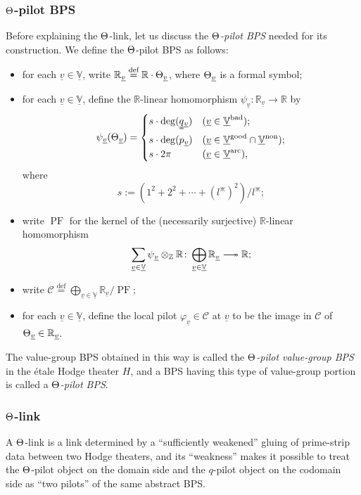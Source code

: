 \documentclass[12pt, reqno, a4paper]{amsart}
\def\udl#1{\underline{#1}} %
\def\eqdef{\stackrel{\textrm{def}}{=}} %
\def\surjlongto{\relbar\joinrel\twoheadrightarrow}
\def\bZ{\mathbb{Z}} %
\def\bR{\mathbb{R}} %
\def\bV{\mathbb{V}}
\def\cC{{\mathcal{C}}}
\def\uV{\udl{\bV}} %
\def\uv{\udl{v}} %
\def\bad{\mathrm{bad}}
\def\good{\mathrm{good}}
\DeclareMathOperator{\PF}{PF}
\def\non{\mathrm{non}}
\def\arc{\mathrm{arc}}
\begin{document}
\subsubsection{$\Th$-pilot BPS}\label{subsub:ThPilotBPS}
Before explaining the \(\Th\)-link, let us discuss the \emph{$\Th$-pilot BPS} needed for its construction.
We define the $\Th$-pilot BPS as follows: 
\begin{itemize}
\item
for each $\uv \in \uV$, write $\bR_{\uv} \eqdef \bR \cdot \Th_{\uv}$, where $\Th_{\uv}$ is a formal symbol;
\item 
for each $\uv\in\uV$, define the $\bR$-linear homomorphism $\psi_{\uv}\colon\bR_{\uv}\to\bR$ by 
$$
\psi_{\uv}(\Th_{\uv})=\begin{cases}
s\cdot 
\deg(\uuqq_{\uv}) & (\uv\in\uV^{\bad});\\ s\cdot \deg(p_{\uv}) & (\uv\in\uV^{\good}\cap\uV^{\non});\\ s\cdot 2\pi & (\uv\in\uV^{\arc}), \end{cases}
$$
where
$$
s := (1^2+2^2+\cdots+(l^{\divideontimes})^2)/l^{\divideontimes}; 
$$
\item 
write $\PF$ for the kernel of the (necessarily surjective) $\bR$-linear homomorphism 
\begin{equation}\label{eqn:qPilotMap2}
\sum_{\uv\in\uV}\psi{}_{\uv}\otimes_{\bZ}\bR\colon\bigoplus_{\uv\in\uV}\bR_{\uv}\surjlongto\bR; 
\end{equation}
\item 
write $\cC \eqdef \bigoplus\limits_{\uv\in\uV}\bR_{\uv}/\PF$; 
\item
for each $\uv \in \uV$, define the local pilot $\varphi_{\uv} \in \cC$ at $\uv$ to be the image in $\cC$ of $\Th_{\uv} \in \bR_{\uv}$.  
\end{itemize}
The value-group BPS obtained in this way is called the \emph{$\Th$-pilot value-group BPS} in the \'etale Hodge theater $H$, and a BPS having this type of value-group portion is called a \emph{$\Th$-pilot BPS}.

\subsubsection{$\Th$-link}\label{subsub:thetaLinkDefinition}
A $\Th$-link is a link determined by a ``sufficiently weakened'' gluing of prime-strip data between two Hodge theaters, and its ``weakness'' makes it possible to treat the \(\Th\)-pilot object on the domain side and the \(q\)-pilot object on the codomain side as ``two pilots'' of the same abstract BPS.
\end{document}
